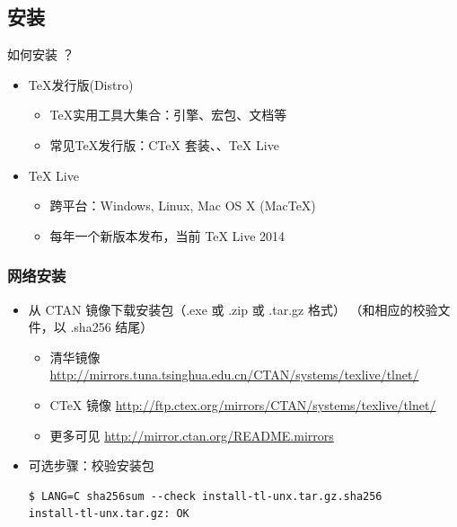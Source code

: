 \documentclass[xcolor=table,dvipsnames,svgnames]{beamer}
\def\TeXLive{\TeX{} Live\xspace}
\let\TL=\TeXLive
\begin{document}
\subsection{安装}

\begin{frame}{如何安装 ？}
  \begin{itemize}
    \item \TeX{}发行版(Distro)
      \begin{itemize}
        \item \TeX{}实用工具大集合：引擎、宏包、文档等
        \item 常见\TeX{}发行版：CTeX 套装、、\alert{\TL}
      \end{itemize}
    \item \TL
      \begin{itemize}
        \item 跨平台：Windows, Linux, Mac OS X (Mac\TeX)
        \item 每年一个新版本发布，当前 \TL 2014
      \end{itemize}
  \end{itemize}
\end{frame}

\begin{frame}[fragile]
  \frametitle{网络安装}
  \begin{itemize}
    \item 从 CTAN 镜像下载安装包（.exe 或 .zip 或 .tar.gz 格式）
（和相应的校验文件，以 .sha256 结尾）
\begin{itemize} %
  \item 清华镜像 \url{http://mirrors.tuna.tsinghua.edu.cn/CTAN/systems/texlive/tlnet/}
  \item CTeX 镜像 \url{http://ftp.ctex.org/mirrors/CTAN/systems/texlive/tlnet/}
  \item 更多可见 \url{http://mirror.ctan.org/README.mirrors}
\end{itemize}

\item 可选步骤：校验安装包
\begin{lstlisting}
$ LANG=C sha256sum --check install-tl-unx.tar.gz.sha256
install-tl-unx.tar.gz: OK
\end{lstlisting}

  \end{itemize}
\end{frame}
\end{document}
